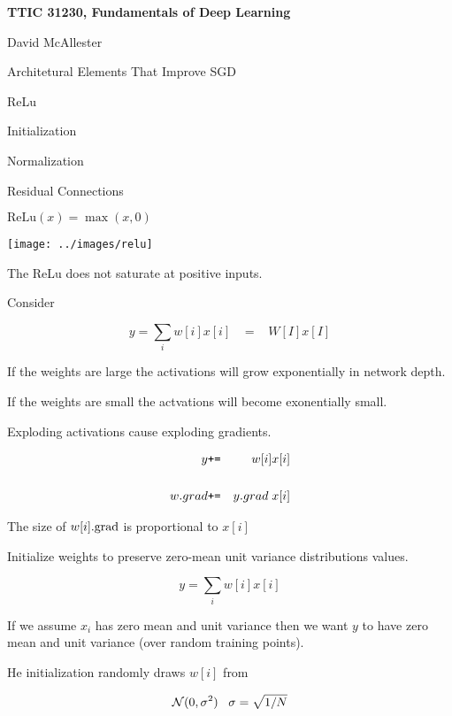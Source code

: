 




{\Huge

  \centerline{\bf TTIC 31230, Fundamentals of Deep Learning}
  \bigskip
  \centerline{David McAllester}
  \vfill
  \centerline{Architetural Elements That Improve SGD}
  \vfill
  \vfill
  \centerline{ReLu}
  \vfill
  \centerline{Initialization}
  \vfill
  \centerline{Normalization}
  \vfill
  \centerline{Residual Connections}


$\mathrm{ReLu}(x) = \max(x,0)$

\vfill
\centerline{\texttt{[image: ../images/relu]}}

\vfill
The ReLu does not saturate at positive inputs.


Consider

\vfill
$$y = \sum_i w[i]x[i]  \;\;\;= \;\;\; W[I]x[I]$$

\vfill
If the weights are large the activations will grow exponentially in network depth.

\vfill
If the weights are small the actvations will become exonentially small.


Exploding activations cause exploding gradients.

\begin{eqnarray*}
y  & \mbox{\tt +=} & w[i]x[i] \\
\\
w.grad & \mbox{\tt +=} & y.grad \; x[i]
\end{eqnarray*}

\vfill
The size of $w[i].\mathrm{grad}$ is proportional to $x[i]$


Initialize weights to preserve zero-mean unit variance distributions values.

$$y = \sum_i w[i]x[i]$$

\vfill
If we assume $x_i$ has zero mean and unit variance then we want $y$
to have zero mean and unit variance (over random training points).

\vfill
He initialization randomly draws $w[i]$ from

$${\cal N}(0,\sigma^2)\;\;\;\sigma = \sqrt{1/N}$$

}
